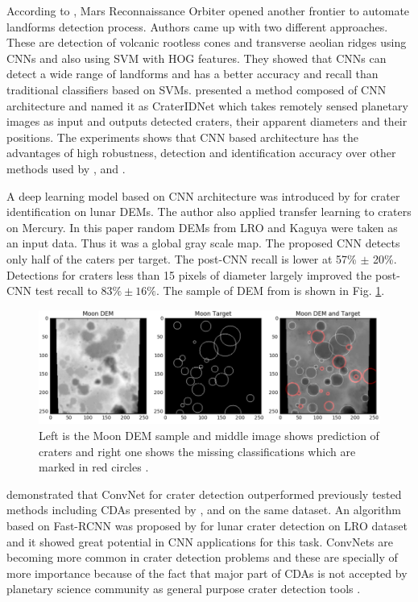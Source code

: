 \documentclass[11pt]{article}
\begin{document}
According to \cite{palafox2017automated}, Mars Reconnaissance Orbiter opened another frontier to automate landforms detection process. Authors came up with two different approaches. These are detection of volcanic rootless cones and transverse aeolian ridges using CNNs and also using SVM with HOG features. They showed that CNNs can detect a wide range of landforms and has a better accuracy and recall than traditional classifiers based on SVMs. \cite{wang2018crateridnet} presented a method composed of CNN architecture and named it as CraterIDNet which takes remotely sensed planetary images as input and outputs detected craters, their apparent diameters and their positions. The experiments shows that CNN based architecture has the advantages of high robustness, detection and identification accuracy over other methods used by \cite{urbach2009automatic}, \cite{bandeira2010automatic} and \cite{ding2011subkilometer}.

A deep learning model based on CNN architecture was introduced by \cite{silburt2019lunar} for crater identification on lunar DEMs. The author also applied transfer learning to craters on Mercury. In this paper random DEMs from LRO and Kaguya were taken as an input data. Thus it was a global gray scale map. The proposed CNN detects only half of the caters per target. The post-CNN recall is lower at 57\% $\pm$ 20\%. Detections for craters less than 15 pixels of diameter largely improved the post-CNN test recall to $83 \% \pm 16 \%$. The sample of DEM from \cite{silburt2019lunar} is shown in Fig. \ref{dem_}.

\begin{figure}[ht!]
	\centering
	\includegraphics[width=.8\linewidth]{files/unet/dem.png}
	\caption{Left is the Moon DEM sample and middle image shows prediction of craters and right one shows the missing classifications which are marked in red circles \cite{silburt2019lunar}.}
	\label{dem_}
\end{figure}

\cite{cohen2016crater} demonstrated that ConvNet for crater detection outperformed previously tested methods including CDAs presented by \cite{stepinski2009machine}, \cite{bandeira2010automatic} and \cite{ding2011subkilometer} on the same dataset. An algorithm based on Fast-RCNN was proposed by \cite{emami2015automatic} for lunar crater detection on LRO dataset and it showed great potential in CNN applications for this task. ConvNets are becoming more common in crater detection problems and these are specially of more importance because of the fact that major part of CDAs is not accepted by planetary science community as general purpose crater detection tools \cite{emami2015automatic}.
\end{document}
